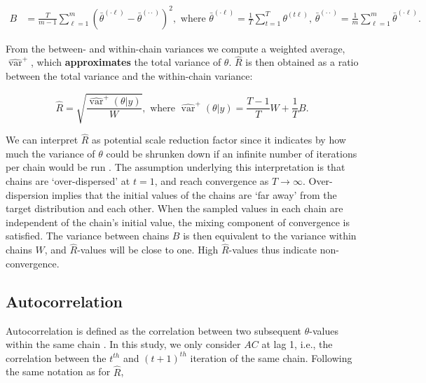 \documentclass[Royal,times,sageh]{sagej}
\begin{document}
\begin{align*}
B&=\frac{T}{m-1} \sum_{\ell=1}^{m}\left(\bar{\theta}^{(\cdot \ell)}-\bar{\theta}^{(\cdot \cdot)}\right)^{2}, \text { where } \bar{\theta}^{(\cdot \ell)}=\frac{1}{T} \sum_{t=1}^{T} \theta^{(t \ell)} \text{, } \bar{\theta}^{(\cdot \cdot)}=\frac{1}{m} \sum_{\ell=1}^{m} \bar{\theta}^{(\cdot \ell)}. 
\end{align*}

\noindent From the between- and within-chain variances we compute a weighted average, \(\widehat{\operatorname{var}}^{+}\), which \textbf{approximates} the total variance of \(\theta\). \(\widehat{R}\) is then obtained as a ratio between the total variance and the within-chain variance:

\begin{equation*}
\widehat{R}=\sqrt{\frac{\widehat{\operatorname{var}}^{+}(\theta | y)}{W}},
\text{ where } \widehat{\operatorname{var}}^{+}(\theta | y)=\frac{T-1}{T} W+\frac{1}{T} B.
\end{equation*}

We can interpret \(\widehat{R}\) as potential scale reduction factor since it indicates by how much the variance of \(\theta\) could be shrunken down if an infinite number of iterations per chain would be run \citep{gelm92}. The assumption underlying this interpretation is that chains are `over-dispersed' at \(t=1\), and reach convergence as \(T \to \infty\). Over-dispersion implies that the initial values of the chains are `far away' from the target distribution and each other. When the sampled values in each chain are independent of the chain's initial value, the mixing component of convergence is satisfied. The variance between chains \(B\) is then equivalent to the variance within chains \(W\), and \(\widehat{R}\)-values will be close to one. High \(\widehat{R}\)-values thus indicate non-convergence.

\hypertarget{autocorrelation}{%
\subsection{Autocorrelation}\label{autocorrelation}}

Autocorrelation is defined as the correlation between two subsequent \(\theta\)-values within the same chain \citep[p.~147]{lync07}. In this study, we only consider \(AC\) at lag 1, i.e., the correlation between the \(t^{th}\) and \((t+1)^{th}\) iteration of the same chain. Following the same notation as for \(\widehat{R}\),
\end{document}
